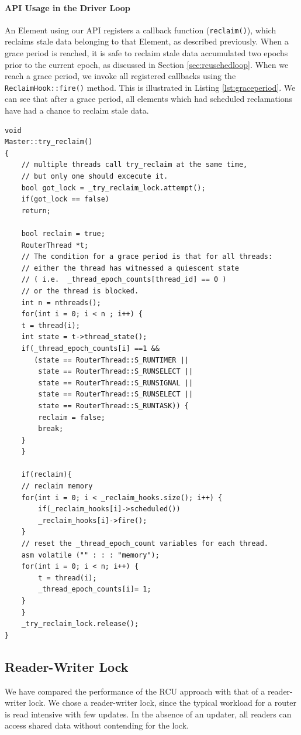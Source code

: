 \documentclass[a4paper]{article}
\begin{document}
\paragraph{API Usage in the Driver Loop}
An Element using our API registers a callback function (\texttt{reclaim()}), which reclaims stale data belonging to that Element, as described previously. When a grace period is reached, it is safe to reclaim stale data accumulated two epochs prior to the current epoch, as discussed in Section \ref{sec:rcuschedloop}. When we reach a grace period, we invoke all registered callbacks using the \texttt{ReclaimHook::fire()} method. This is illustrated in Listing \ref{lst:graceperiod}. We can see that after a grace period, all elements which had scheduled reclamations have had a chance to reclaim stale data.  
\begin{lstlisting}[float=pht, caption=Invoking callbacks for reclamations using the API.,label=lst:graceperiod, lineskip={-0.4pt}]
void 
Master::try_reclaim()
{
    // multiple threads call try_reclaim at the same time,
    // but only one should excecute it.
    bool got_lock = _try_reclaim_lock.attempt();
    if(got_lock == false)
	return;

    bool reclaim = true;
    RouterThread *t;
    // The condition for a grace period is that for all threads:
    // either the thread has witnessed a quiescent state
    // ( i.e.  _thread_epoch_counts[thread_id] == 0 )
    // or the thread is blocked.
    int n = nthreads();
    for(int i = 0; i < n ; i++) {
	t = thread(i);
	int state = t->thread_state();
	if(_thread_epoch_counts[i] ==1 && 
	   (state == RouterThread::S_RUNTIMER ||
	    state == RouterThread::S_RUNSELECT ||
	    state == RouterThread::S_RUNSIGNAL ||
	    state == RouterThread::S_RUNSELECT ||
	    state == RouterThread::S_RUNTASK)) {
	    reclaim = false;
	    break;
	}
    }

    if(reclaim){
	// reclaim memory
	for(int i = 0; i < _reclaim_hooks.size(); i++) {
	    if(_reclaim_hooks[i]->scheduled())
		_reclaim_hooks[i]->fire();
	}
	// reset the _thread_epoch_count variables for each thread.
	asm volatile ("" : : : "memory");
	for(int i = 0; i < n; i++) {
	    t = thread(i);
	    _thread_epoch_counts[i]= 1;
	}
    }
    _try_reclaim_lock.release();
}
\end{lstlisting}

\subsection{Reader-Writer Lock}
We have compared the performance of the RCU approach with that of a reader-writer lock. We chose a reader-writer lock, since the typical workload for a router is read intensive with few updates. In the absence of an updater, all readers can access shared data without contending for the lock.\\
\end{document}
